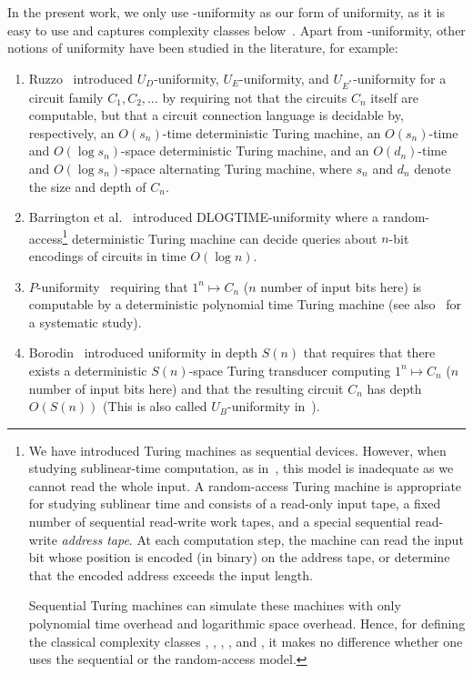 In the present work, we only use \LOGSPACE-uniformity as our form of uniformity,
as it is easy to use and captures complexity classes
below~\LOGSPACE. 
Apart from \LOGSPACE-uniformity, other notions of uniformity have been studied in the literature, for example:
\begin{enumerate}
	\item Ruzzo~\cite{DBLP:journals/jcss/Ruzzo81} introduced $U_D$-uniformity,
	$U_E$-uniformity, and $U_{E^*}$-uniformity for a circuit family
	$C_1, C_2, \ldots$ by requiring not that the circuits $C_n$ itself are
	computable, but that a circuit connection language is decidable
	by, respectively, an $O(s_n)$-time deterministic Turing machine,
	an $O(s_n)$-time and $O(\log s_n)$-space deterministic Turing machine,
	and an $O(d_n)$-time and $O(\log s_n)$-space alternating Turing machine,
	where $s_n$ and $d_n$ denote the size and depth of $C_n$.
			
	\item Barrington et al.~\cite{BarringtonIS90} introduced DLOGTIME-uniformity where a random-access\footnote{We have introduced Turing machines as sequential devices. However, when studying sublinear-time computation, as in~\cite{BarringtonIS90}, this model is inadequate as we cannot read the whole input. A random-access Turing machine is appropriate for studying sublinear time and consists of a read-only input tape, a fixed number of sequential read-write work tapes, and a special sequential read-write \emph{address tape}. At each computation step, the machine can read the input bit whose position is encoded (in binary) on the address tape, or determine that the encoded address exceeds the input length. 
		
		Sequential Turing machines can simulate these machines with only polynomial time overhead and logarithmic space overhead. Hence, for defining the classical complexity classes \LOGSPACE, \NL, \PTIME, \NP, and \PSPACE, it makes no difference whether one uses the sequential or the random-access model.}
	deterministic Turing machine
	can decide queries about $n$-bit encodings of 
	circuits in time $O(\log n)$.
	
	\item $P$-uniformity~\cite{DBLP:journals/siamcomp/BeameCH86} requiring that $1^n \mapsto C_n$ ($n$ number of input bits here)
	is computable by a deterministic polynomial time Turing machine (see also~\cite{DBLP:journals/jacm/Allender89}
	for a systematic study). 
		
	\item Borodin~\cite{DBLP:journals/siamcomp/Borodin77} introduced uniformity in depth $S(n)$
	that requires that there exists a deterministic $S(n)$-space Turing transducer computing $1^n \mapsto C_n$ ($n$ number of input bits here) and that the resulting circuit $C_n$ has depth $O(S(n))$ 
	(This is also called $U_B$-uniformity in~\cite{DBLP:journals/jcss/Ruzzo81,Wegener87}).
\end{enumerate} 


